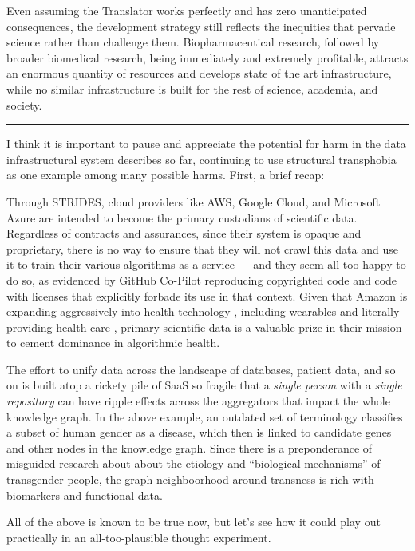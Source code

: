 \documentclass[10pt]{article}
\begin{document}
\begin{multicols}{2}
Even assuming the Translator works perfectly and has zero unanticipated
consequences, the development strategy still reflects the inequities
that pervade science rather than challenge them. Biopharmaceutical
research, followed by broader biomedical research, being immediately and
extremely profitable, attracts an enormous quantity of resources and
develops state of the art infrastructure, while no similar
infrastructure is built for the rest of science, academia, and society.

\begin{center}\rule{0.5\linewidth}{0.5pt}\end{center}

I think it is important to pause and appreciate the potential for harm
in the data infrastructural system describes so far, continuing to use
structural transphobia as one example among many possible harms. First,
a brief recap:

Through STRIDES, cloud providers like AWS, Google Cloud, and Microsoft
Azure are intended to become the primary custodians of scientific data.
Regardless of contracts and assurances, since their system is opaque and
proprietary, there is no way to ensure that they will not crawl this
data and use it to train their various algorithms-as-a-service --- and
they seem all too happy to do so, as evidenced by GitHub Co-Pilot
reproducing copyrighted code and code with licenses that explicitly
forbade its use in that context. Given that Amazon is expanding
aggressively into health technology\cite{AWSAnnouncesAWS2021} ,
including wearables and literally providing
\href{https://amazon.care/}{health care} \cite{lermanAmazonBuiltIts2021} , primary scientific data is a valuable
prize in their mission to cement dominance in algorithmic health.

The effort to unify data across the landscape of databases, patient
data, and so on is built atop a rickety pile of SaaS so fragile that a
\emph{single person} with a \emph{single repository} can have ripple
effects across the aggregators that impact the whole knowledge graph. In
the above example, an outdated set of terminology classifies a subset of
human gender as a disease, which then is linked to candidate genes and
other nodes in the knowledge graph. Since there is a preponderance of
misguided research about about the etiology and ``biological
mechanisms'' of transgender people, the graph neighboorhood around
transness is rich with biomarkers and functional data.

All of the above is known to be true now, but let's see how it could
play out practically in an all-too-plausible thought experiment.


\end{multicols}
\end{document}

